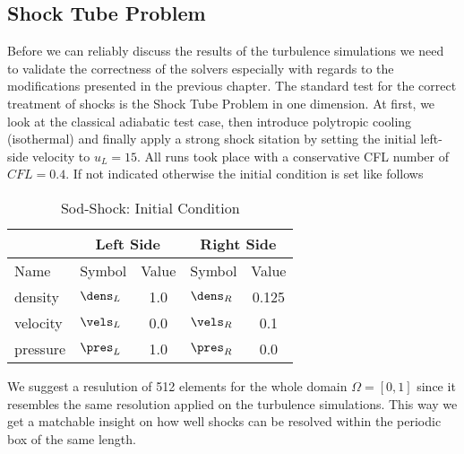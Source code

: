 \subsection{ Shock Tube Problem}
Before we can reliably discuss the results of the turbulence simulations we
need to validate the correctness of the solvers especially with regards to the
modifications presented in the previous chapter. The standard test for the
correct treatment of shocks is the  Shock Tube Problem in one
dimension. At first, we look at the classical adiabatic test case, then
introduce polytropic cooling (isothermal) and finally apply a strong shock
sitation by setting the initial left-side velocity to $u_L = 15$. All runs took
place with a conservative CFL number of $CFL = 0.4$. If not indicated otherwise
the initial condition is set like follows
\begin{table}[H]
\caption{Sod-Shock: Initial Condition}
\centering
\begin{tabular}{llc|lc}
\toprule
&
\multicolumn{2}{c}{Left Side} &
\multicolumn{2}{c}{Right Side} \\
\midrule
Name & Symbol & Value & Symbol & Value\\
\midrule
density         & $\dens_{L}$       & 1.0 & $\dens_{R}$ & 0.125 \\ 
velocity        & $\vels_{L}$       & 0.0 & $\vels_{R}$ & 0.1 \\ 
pressure        & $\pres_{L}$       & 1.0 & $\pres_{R}$ & 0.0 \\  
\bottomrule
\end{tabular}
\label{tab:initial-state-sod-shock}
\end{table}
We suggest a resulution of 512 elements for the whole domain $\Omega = [0,1]$
since it resembles the same resolution applied on the turbulence simulations.
This way we get a matchable insight on how well shocks can be resolved within
the periodic box of the same length.

